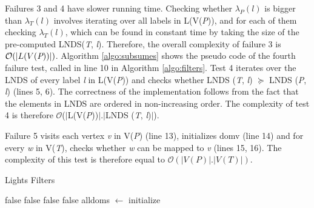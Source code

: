 \documentclass{l4proj}
\begin{document}
Failures 3 and 4 have slower running time. Checking whether $\lambda_{P}(l)$ is bigger than $\lambda_{T}(l)$ involves iterating over all labels in L(V(\emph{P})), and for each of them checking $\lambda_{T}(l)$, which can be found in constant time by taking the size of the pre-computed LNDS(\emph{T}, \emph{l}). Therefore, the overall complexity of failure 3 is $\mathcal{O}(|L(V(\emph{P}))|)$. Algorithm \ref{algo:subsumes} shows the pseudo code of the fourth failure test, called in line 10 in Algorithm \ref{algo:filters}. Test 4 iterates over the LNDS of every label \emph{l} in L(V(\emph{P})) and checks whether LNDS (\emph{T}, \emph{l}) $\succeq$ LNDS (\emph{P}, \emph{l}) (lines 5, 6). The correctness of the implementation follows from the fact that the elements in LNDS are ordered in non-increasing order. The complexity of test 4 is therefore $\mathcal{O}$($|$L(V(\emph{P}))$|.|$LNDS (\emph{T}, \emph{l})$|$).

Failure 5 visits each vertex \emph{v} in V(\emph{P}) (line 13), initializes domv (line 14) and for every \emph{w} in V(\emph{T}), checks whether \emph{w} can be mapped to \emph{v} (lines 15, 16). The complexity of this test is therefore equal to $\mathcal{O}(|V(P)|.|V(T)|)$.
\begin{algorithm}
\centering
\caption{Lights Filters}
\label{algo:filters}
\begin{algorithmic}[1]
 \Return false 
\EndIf
{} \Return false 
\EndIf
{} %
	 \Return false \EndIf {}
\EndFor
{} \Return false \EndIf {}
\State alldoms $\gets$ initialize 
\EndFor \\
 
\EndProcedure
\end{algorithmic}
\end{algorithm}
\end{document}
